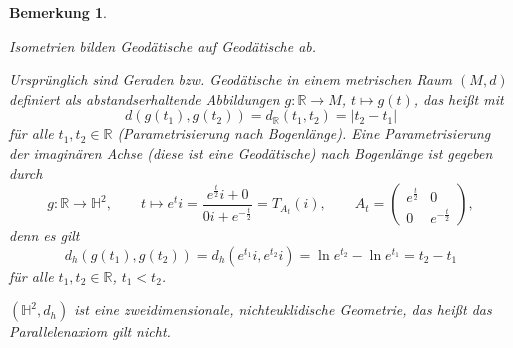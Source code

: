 \documentclass[11pt]{book}
\numberwithin{dummy}{section}
\newtheorem{remark}[theorem]{Bemerkung}
\theoremstyle{nonumberbreak}
\newcommand{\R}{\mathbb{R}}
\newcommand{\He}{\mathbb{H}}
\newcommand{\la}{\longrightarrow}
\begin{document}
\begin{spacing}{1.4}
\begin{remark}
\begin{compactenum}
\item Isometrien bilden Geodätische auf Geodätische ab.
\item Ursprünglich sind Geraden bzw. Geodätische in einem metrischen Raum $(M,d)$ definiert als abstandserhaltende Abbildungen $g: \R \la M$, $t \mapsto g(t)$, das heißt mit 
$$d\left( g(t_1), g(t_2)\right) = d_{\R}(t_1, t_2) = \vert t_2 - t_1 \vert$$
für alle $t_1, t_2 \in \R$ (Parametrisierung nach Bogenlänge). Eine Parametrisierung der imaginären Achse (diese ist eine Geodätische) nach Bogenlänge ist gegeben durch
$$g: \R \la \He^2, \qquad t \mapsto e^{t}i = \frac{e^{\frac{t}{2}} i + 0}{ 0 i + e^{-\frac{t}{2}}} = T_{A_t}(i), \qquad A_{t} = \begin{pmatrix}e^{\frac{t}{2}} & 0 \\[-2pt] 0 & e^{-\frac{t}{2}}\end{pmatrix},$$
denn es gilt 
$$d_h( g(t_1), g(t_2)) = d_h(e^{t_1}i, e^{t_2}i) = \ln e^{t_2} - \ln e^{t_1} = t_2 - t_1$$
für alle $t_1, t_2 \in \R$, $t_1 < t_2$.
\item $(\He^2, d_h)$ ist eine zweidimensionale, nichteuklidische Geometrie, das heißt das Parallelenaxiom gilt nicht.

\end{compactenum}
\end{remark}




\end{spacing}
\end{document}
